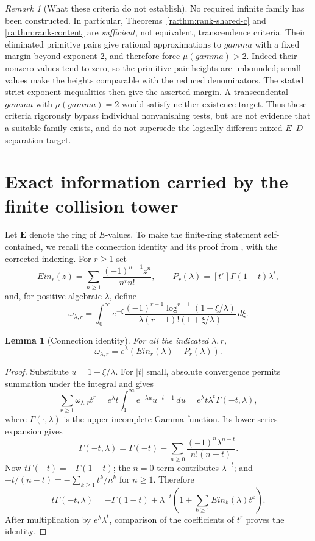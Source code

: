 \documentclass[11pt,a4paper]{article}
\newcommand{\E}{\mathbf E}
\DeclareMathOperator{\Ein}{Ein}
\newtheorem{lemma}[theorem]{Lemma}
\theoremstyle{definition}
\theoremstyle{remark}
\newtheorem{remark}[theorem]{Remark}
\theoremstyle{plain}
\numberwithin{equation}{section}
\def\Ein{Ein}\def\gamma{gamma}\def\delta{delta}\def\eta{eta}%
\begin{document}
\begin{remark}[What these criteria do not establish]
No required infinite family has been constructed.  In particular,
Theorems~\ref{ra:thm:rank-shared-c} and \ref{ra:thm:rank-content} are
\emph{sufficient}, not equivalent, transcendence criteria.  Their
eliminated primitive pairs give rational approximations to $\gamma$
with a fixed margin beyond exponent $2$, and therefore force
$\mu(\gamma)>2$.  Indeed their nonzero values tend to zero, so the
primitive pair heights are unbounded; small values make the heights
comparable with the reduced denominators.  The stated strict exponent
inequalities then give the asserted margin.  A transcendental $\gamma$
with $\mu(\gamma)=2$ would satisfy neither existence target.  Thus these
criteria rigorously bypass individual nonvanishing tests, but are not
evidence that a suitable family exists, and do not supersede the
logically different mixed $E$--$D$ separation target.
\end{remark}

\section{Exact information carried by the finite collision tower}
Let $\E$ denote the ring of $E$-values. To make the finite-ring statement
self-contained, we recall the connection identity and its proof from
\cite{KEIO}, with the corrected indexing. For $r\ge1$ set
\[
 \Ein_r(z)=\sum_{n\ge1}\frac{(-1)^{n-1}z^n}{n^r n!},\qquad
 P_r(\lambda)=[t^r]\Gamma(1-t)\lambda^t,
\]
and, for positive algebraic $\lambda$, define
\[
 \omega_{\lambda,r}=
 \int_0^\infty e^{-\xi}
 \frac{(-1)^{r-1}\log^{r-1}(1+\xi/\lambda)}
 {\lambda(r-1)!(1+\xi/\lambda)}\,d\xi.
\]
\begin{lemma}[Connection identity]\label{ra:lem:collision}
For all the indicated $\lambda,r$,
\[
 \omega_{\lambda,r}=e^\lambda(\Ein_r(\lambda)-P_r(\lambda)).
\]
\end{lemma}
\begin{proof}
Substitute $u=1+\xi/\lambda$. For $|t|$ small, absolute convergence
permits summation under the integral and gives
\[
 \sum_{r\ge1}\omega_{\lambda,r}t^r
 =e^\lambda t\int_1^\infty e^{-\lambda u}u^{-t-1}\,du
 =e^\lambda t\lambda^t\Gamma(-t,\lambda),
\]
where $\Gamma(\cdot,\lambda)$ is the upper incomplete Gamma function.
Its lower-series expansion gives
\[
 \Gamma(-t,\lambda)=\Gamma(-t)
 -\sum_{n\ge0}\frac{(-1)^n\lambda^{n-t}}{n!(n-t)}.
\]
Now $t\Gamma(-t)=-\Gamma(1-t)$; the $n=0$ term contributes
$\lambda^{-t}$; and $-t/(n-t)=-\sum_{k\ge1}t^k/n^k$ for $n\ge1$.
Therefore
\[
 t\Gamma(-t,\lambda)=-\Gamma(1-t)
 +\lambda^{-t}\left(1+\sum_{k\ge1}\Ein_k(\lambda)t^k\right).
\]
After multiplication by $e^\lambda\lambda^t$, comparison of the
coefficients of $t^r$ proves the identity.
\end{proof}
\end{document}

